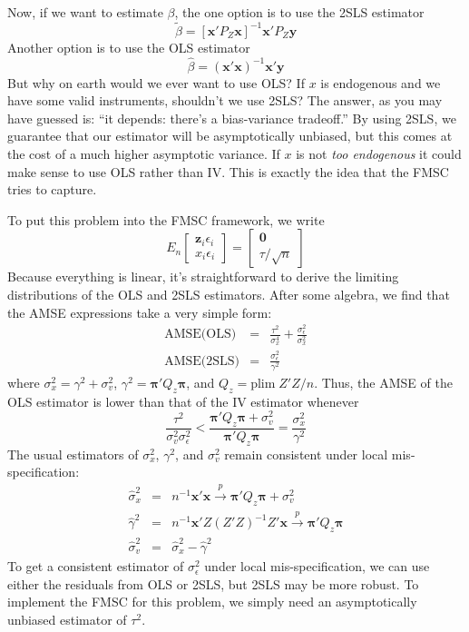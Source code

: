 \documentclass[12pt]{article}
\theoremstyle{definition}
\begin{document}
Now, if we want to estimate $\beta$, the one option is to use the 2SLS estimator
	$$\widetilde{\beta} = \left[ \textbf{x}'P_Z\textbf{x}\right]^{-1}\textbf{x}'P_Z \textbf{y}$$
Another option is to use the OLS estimator
	$$\widehat{\beta} = \left(\textbf{x}'\textbf{x} \right)^{-1}\textbf{x}'\textbf{y}$$
But why on earth would we ever want to use OLS? If $x$ is endogenous and we have some valid instruments, shouldn't we use 2SLS? The answer, as you may have guessed is: ``it depends: there's a bias-variance tradeoff.'' By using 2SLS, we guarantee that our estimator will be asymptotically unbiased, but this comes at the cost of a much higher asymptotic variance. If $x$ is not \emph{too endogenous} it could make sense to use OLS rather than IV. This is exactly the idea that the FMSC tries to capture.

To put this problem into the FMSC framework, we write
	 $$E_n \left[\begin{array}{c} \mathbf{z}_i \epsilon_i \\ x_i \epsilon_i \end{array}\right] = \left[\begin{array}{c} \mathbf{0} \\ \tau/\sqrt{n} \end{array}\right]$$
Because everything is linear, it's straightforward to derive the limiting distributions of the OLS and 2SLS estimators. After some algebra, we find that the AMSE expressions take a very simple form:
  \begin{eqnarray*}
  \mbox{AMSE(OLS)} &=& \frac{\tau^2}{\sigma_x^4} + \frac{\sigma_\epsilon^2}{\sigma_x^2}\\
  \mbox{AMSE(2SLS)} &=& \frac{\sigma_\epsilon^2}{\gamma^2}
  \end{eqnarray*}
where $\sigma_x^2 = \gamma^2 + \sigma_v^2$, $\gamma^2 = \boldsymbol{\pi}'Q_z \boldsymbol{\pi}$, and $Q_z =\mbox{plim} \; Z'Z/n$. Thus, the AMSE of the OLS estimator is lower than that of the IV estimator whenever
$$\frac{\tau^2}{\sigma_v^2 \sigma_\epsilon^2}  < \frac{\boldsymbol{\pi}'Q_z \boldsymbol{\pi} + \sigma_v^2}{\boldsymbol{\pi}'Q_z \boldsymbol{\pi}} = \frac{\sigma_x^2}{\gamma^2} $$
The usual estimators of $\sigma_x^2$, $\gamma^2$, and $\sigma_v^2$ remain consistent under local mis-specification:
  \begin{eqnarray*}
     \widehat{\sigma}_x^2 &=& n^{-1}\mathbf{x}' \mathbf{x} \overset{p}{\rightarrow} \boldsymbol{\pi}'Q_z \boldsymbol{\pi} + \sigma_v^2\\
      \widehat{\gamma}^2 &=& n^{-1}\mathbf{x}' Z (Z'Z)^{-1}Z' \mathbf{x} \overset{p}{\rightarrow} \boldsymbol{\pi}'Q_z \boldsymbol{\pi} \\
      \widehat{\sigma}_v^2 &=& \widehat{\sigma}_x^2 - \widehat{\gamma}^2
  \end{eqnarray*}
To get a consistent estimator of $\sigma_\epsilon^2$ under local mis-specification, we can use either the residuals from OLS or 2SLS, but 2SLS may be more robust. To implement the FMSC for this problem, we simply need an asymptotically unbiased estimator of $\tau^2$. 
\end{document}
